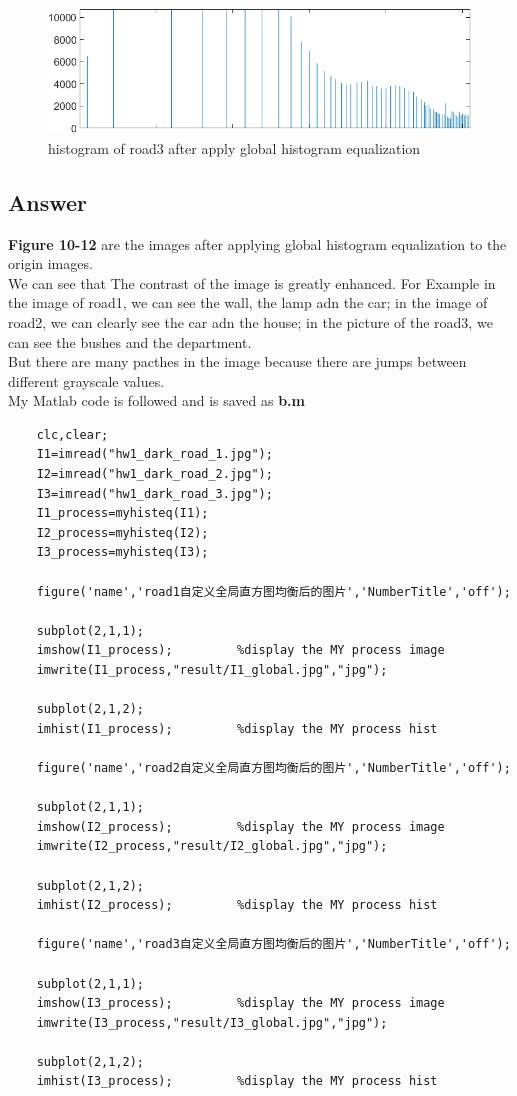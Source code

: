 \documentclass[
	12pt, %
]{fphw}
\begin{document}
\begin{figure}[H]
 
	\centering
	\includegraphics[width=1\columnwidth]{T2/result/hist3_global.png} 
	\caption{histogram of road3 after apply global histogram equalization}
	\label{fig15}
\end{figure}
\subsection*{Answer} 
\textbf{Figure 10-12} are the images after applying global histogram equalization to the origin images.\\
We can see that The contrast of the image is greatly enhanced. For Example in the image of road1, we can see the wall, the lamp adn the car; in the image of road2, we can clearly see the car adn the house; in the picture of the road3, we can see the bushes and the department.\\
But there are many pacthes in the image because there are jumps between different grayscale values.\\
My Matlab code is followed and is saved as \textbf{b.m}
\begin{lstlisting}
	clc,clear;
	I1=imread("hw1_dark_road_1.jpg");
	I2=imread("hw1_dark_road_2.jpg");
	I3=imread("hw1_dark_road_3.jpg");
	I1_process=myhisteq(I1);
	I2_process=myhisteq(I2);
	I3_process=myhisteq(I3);

	figure('name','road1自定义全局直方图均衡后的图片','NumberTitle','off');

	subplot(2,1,1);
	imshow(I1_process);         %display the MY process image
	imwrite(I1_process,"result/I1_global.jpg","jpg");
			
	subplot(2,1,2);
	imhist(I1_process);         %display the MY process hist

	figure('name','road2自定义全局直方图均衡后的图片','NumberTitle','off');

	subplot(2,1,1);
	imshow(I2_process);         %display the MY process image
	imwrite(I2_process,"result/I2_global.jpg","jpg");
			
	subplot(2,1,2);
	imhist(I2_process);         %display the MY process hist

	figure('name','road3自定义全局直方图均衡后的图片','NumberTitle','off');

	subplot(2,1,1);
	imshow(I3_process);         %display the MY process image
	imwrite(I3_process,"result/I3_global.jpg","jpg");
			
	subplot(2,1,2);
	imhist(I3_process);         %display the MY process hist
\end{lstlisting}
\end{document}

